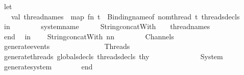 \begin{isabellebody}
\ \ \ \ \ \ let\isanewline
\ \ \ \ \ \ \ \ val\ thread{\isacharunderscore}{\kern0pt}names\ {\isacharequal}{\kern0pt}\ map\ {\isacharparenleft}{\kern0pt}fn\ t\ {\isacharequal}{\kern0pt}{\isachargreater}{\kern0pt}\ Binding{\isachardot}{\kern0pt}name{\isacharunderscore}{\kern0pt}of\ {\isacharparenleft}{\kern0pt}{\isacharhash}{\kern0pt}nom{\isacharunderscore}{\kern0pt}thread\ t{\isacharparenright}{\kern0pt}{\isacharparenright}{\kern0pt}\ threads{\isacharunderscore}{\kern0pt}decls\isanewline
\ \ \ \ \ \ in\isanewline
\ \ \ \ \ \ \ \ system{\isacharunderscore}{\kern0pt}name\ {\isacharcircum}{\kern0pt}\ {\isachardoublequote}{\kern0pt}\ {\isacharequal}{\kern0pt}\ {\isachardoublequote}{\kern0pt}\ {\isacharcircum}{\kern0pt}\ String{\isachardot}{\kern0pt}concatWith\ {\isachardoublequote}{\kern0pt}\ {\isacharbar}{\kern0pt}{\isacharbar}{\kern0pt}{\isacharbar}{\kern0pt}\ {\isachardoublequote}{\kern0pt}\ thread{\isacharunderscore}{\kern0pt}names\isanewline
\ \ \ \ \ \ end\isanewline
\isanewline
\ \ in\isanewline
\ \ \ \ String{\isachardot}{\kern0pt}concatWith\ {\isachardoublequote}{\kern0pt}{\isacharbackslash}{\kern0pt}n{\isacharbackslash}{\kern0pt}n{\isachardoublequote}{\kern0pt}\ {\isacharbrackleft}{\kern0pt}\isanewline
\ \ \ \ \ \ {\isachardoublequote}{\kern0pt}{\isacharminus}{\kern0pt}{\isacharminus}{\kern0pt}\ Channels{\isachardoublequote}{\kern0pt}{\isacharcomma}{\kern0pt}\isanewline
\ \ \ \ \ \ generate{\isacharunderscore}{\kern0pt}events\ {\isacharparenleft}{\kern0pt}{\isacharparenright}{\kern0pt}{\isacharcomma}{\kern0pt}\isanewline
\ \ \ \ \ \ {\isachardoublequote}{\kern0pt}{\isachardoublequote}{\kern0pt}{\isacharcomma}{\kern0pt}\isanewline
\ \ \ \ \ \ {\isachardoublequote}{\kern0pt}{\isacharminus}{\kern0pt}{\isacharminus}{\kern0pt}\ Threads{\isachardoublequote}{\kern0pt}{\isacharcomma}{\kern0pt}\isanewline
\ \ \ \ \ \ generate{\isacharunderscore}{\kern0pt}threads\ globals{\isacharunderscore}{\kern0pt}decls\ threads{\isacharunderscore}{\kern0pt}decls\ thy{\isacharcomma}{\kern0pt}\isanewline
\ \ \ \ \ \ {\isachardoublequote}{\kern0pt}{\isachardoublequote}{\kern0pt}{\isacharcomma}{\kern0pt}\isanewline
\ \ \ \ \ \ {\isachardoublequote}{\kern0pt}{\isacharminus}{\kern0pt}{\isacharminus}{\kern0pt}\ System{\isachardoublequote}{\kern0pt}{\isacharcomma}{\kern0pt}\isanewline
\ \ \ \ \ \ generate{\isacharunderscore}{\kern0pt}system\ {\isacharparenleft}{\kern0pt}{\isacharparenright}{\kern0pt}\isanewline
\ \ \ \ {\isacharbrackright}{\kern0pt}\isanewline
\ \ end\isanewline
{\isacharasterisk}{\kern0pt}{\isacharparenright}{\kern0pt}\isanewline
\isanewline
{\isacartoucheclose}%

\end{isabellebody}
